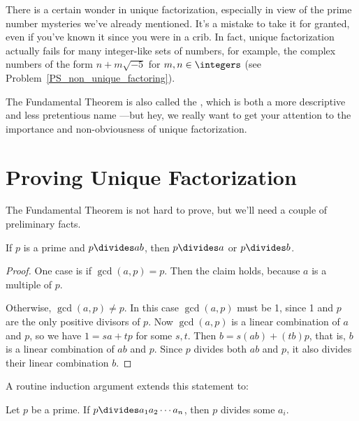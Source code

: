 There is a certain wonder in unique factorization, especially in view
of the prime number mysteries we've already mentioned.  It's a mistake
to take it for granted, even if you've known it since you were in a
crib.  In fact, unique factorization actually fails for many
integer-like sets of numbers, for example, the complex numbers of the
form $n + m\sqrt{-5}$ for $m,n \in \integers$ (see
Problem~\ref{PS_non_unique_factoring}).

The Fundamental Theorem is also called the , which is both a more descriptive and less pretentious name
---but hey, we really want to get your attention to the importance and
non-obviousness of unique factorization.

\section{Proving Unique Factorization}

The Fundamental Theorem is not hard to prove, but we'll need a couple
of preliminary facts.

\begin{lemma}
\label{lem:prime-divides}
If $p$ is a prime and $p \divides ab$, then $p \divides a$ or $p
\divides b$.
\end{lemma}

\begin{proof}
One case is if $\gcd(a, p) = p$.  Then the claim holds, because $a$ is
a multiple of $p$.

Otherwise, $\gcd(a, p) \neq p$.  In this case $\gcd(a, p)$ must be 1,
since 1 and $p$ are the only positive divisors of $p$.  Now $\gcd(a,
p)$ is a linear combination of $a$ and $p$, so we have $1=sa+tp$ for
some $s,t$.  Then $b =s(ab)+ (tb)p$, that is, $b$ is a linear
combination of $ab$ and $p$.  Since $p$ divides both $ab$ and $p$, it
also divides their linear combination $b$.
\end{proof}

A routine induction argument extends this statement to:\iffalse the
fact we assumed last time:\fi

\begin{lemma}
\label{lem:prime-divides-ind}
Let $p$ be a prime.  If $p \divides a_1 a_2 \cdots a_n$, then $p$
divides some $a_i$.
\end{lemma}

